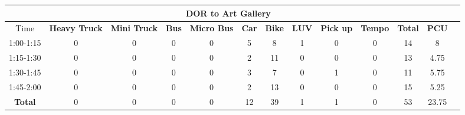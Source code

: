 \begin{landscape}
\begin{table}[h!]
\begin{tabular}{|c|c|c|c|c|c|c|c|c|c|c|c|c|}
    \hline
    \multicolumn{12}{|c|}{\textbf{DOR to Art Gallery}} \\
    \hline
        Time & \textbf{Heavy Truck} & \textbf{Mini Truck} & \textbf{Bus} & \textbf{Micro Bus} & \textbf{Car} & \textbf{Bike} & \textbf{LUV} & \textbf{Pick up} & \textbf{Tempo} & \textbf{\textbf{Total}} & \textbf{PCU} \\
    \hline
1:00-1:15	&0	&0	&0	&0	&5	&8	&1	&0	&0	&14	&8 \\ \hline
1:15-1:30	&0	&0	&0	&0	&2	&11	&0	&0	&0	&13	&4.75 \\ \hline
1:30-1:45	&0	&0	&0	&0	&3	&7	&0	&1	&0	&11	&5.75 \\ \hline
1:45-2:00	&0	&0	&0	&0	&2	&13	&0	&0	&0	&15	&5.25 \\ \hline
\textbf{Total}	&0	&0	&0	&0	&12	&39	&1	&1	&0	&53	&23.75 \\ \hline


\end{tabular}

\end{table}
\end{landscape}


